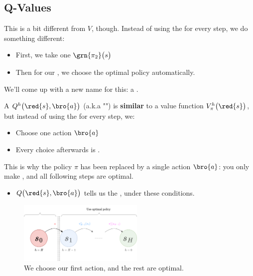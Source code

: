     \phantom{}

    \subsection{Q-Values}

        This is a bit different from $V$, though. Instead of using the  for every step, we do something different:

        \begin{itemize}
            \item First, we take one  $\grn{\pi_2}\big(s\big)$
            \item Then for our , we choose the optimal policy automatically.
        \end{itemize}

        We'll come up with a new name for this: a .\\

        \begin{definition}
            A  $Q^h\big(\red{s},\bro{a}\big)$ (a.k.a "") is \textbf{similar} to a value function $V^h_{\pi}\big(\red{s}\big)$, but instead of using the  for every step, we:

            \begin{itemize}
                \item Choose one action $\bro{a}$
                \item Every choice afterwards is .
            \end{itemize}

            This is why the policy $\pi$ has been replaced by a single action $\bro{a}$: you only make , and all following steps are optimal.

            \begin{itemize}
                \item $Q\big(\red{s},\bro{a}\big)$ tells us the , under these conditions.
            \end{itemize}
            
        \end{definition}

        \begin{figure}[H]
            \centering
            \includegraphics[width=60mm,scale=0.4]{images/mdp_images/q_value.png}
            \caption*{We choose our first action, and the rest are optimal.}
        \end{figure}

